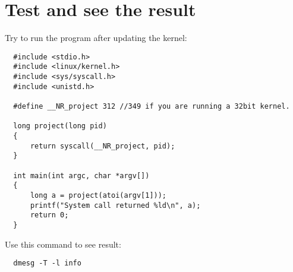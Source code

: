   \section{Test and see the result}
  Try to run the program after updating the kernel:
  \begin{verbatim}
  #include <stdio.h>
  #include <linux/kernel.h>
  #include <sys/syscall.h>
  #include <unistd.h>

  #define __NR_project 312 //349 if you are running a 32bit kernel.

  long project(long pid)
  {
      return syscall(__NR_project, pid);
  }

  int main(int argc, char *argv[])
  {
      long a = project(atoi(argv[1]));
      printf("System call returned %ld\n", a);
      return 0;
  }
  \end{verbatim}
  Use this command to see result:
  \begin{verbatim}
  dmesg -T -l info
  \end{verbatim}
